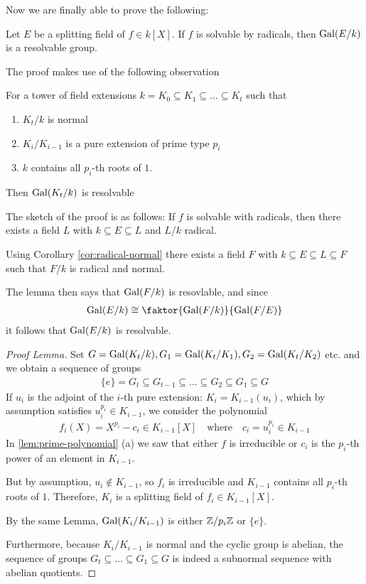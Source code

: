 
Now we are finally able to prove the following:
\begin{thm}[]\label{thm:3-14}
  Let $E$ be a splitting field of $f \in k[X]$.
  If $f$ is solvable by radicals, then $\operatorname{Gal}(E/k)$ is a resolvable group.
\end{thm}
The proof makes use of the following observation
\begin{lem}[]
  For a tower of field extensions
  $
    k = K_0 \subseteq K_1 \subseteq \ldots \subseteq K_t
  $
  such that
  \begin{enumerate}
    \item $K_t/k$ is normal
    \item $K_i/K_{i-1}$ is a pure extension of prime type $p_i$
    \item $k$ contains all $p_i$-th roots of $1$.
  \end{enumerate}
  Then $\operatorname{Gal}(K_t/k)$ is resolvable
\end{lem}
The sketch of the proof is as follows: If $f$ is solvable with radicals, then there exists a field $L$ with $k \subseteq E \subseteq L$ and $L/k$ radical.

Using Corollary \ref{cor:radical-normal} there exists a field $F$ with $k \subseteq E \subseteq L \subseteq F$ such that $F/k$ is radical and normal.

The lemma then says that $\operatorname{Gal}(F/k)$ is resovlable, and since
\begin{align*}
  \Gal(E/k) \iso \faktor{\Gal(F/k)}{\Gal(F/E)}
\end{align*}
it follows that $\operatorname{Gal}(E/k)$ is resolvable.

\begin{proof}[Proof Lemma]
  Set $G = \operatorname{Gal}(K_t/k), G_1 = \operatorname{Gal}(K_t/K_1), G_2 = \operatorname{Gal}(K_t/K_2)$ etc. and we obtain a sequence of groups
  \begin{align*}
    \{e\} = G_t \subseteq G_{t-1} \subseteq \ldots \subseteq G_2 \subseteq G_1 \subseteq G
  \end{align*}
  If $u_i$ is the adjoint of the $i$-th pure extension: $K_i = K_{i-1}(u_i)$, which by assumption satisfies $u_i^{p_i} \in K_{i-1}$, we consider the polynomial
  \begin{align*}
    f_i(X) = X^{p_i} - c_i \in K_{i-1}[X] \quad \text{where} \quad c_i = u_i^{p_i} \in K_{i-1}
  \end{align*}
  In \ref{lem:prime-polynomial} (a) we saw that either $f$ is irreducible or $c_i$ is the $p_i$-th power of an element in $K_{i-1}$.

  But by assumption, $u_i \notin K_{i-1}$, so $f_i$ is irreducible and $K_{i-1}$ contains all $p_i$-th roots of $1$. Therefore, $K_i$ is a splitting field of $f_i \in K_{i-1}[X]$. 

  By the same Lemma, $\operatorname{Gal}(K_i/K_{i-1})$ is either $\mathbb{Z}/p_i\mathbb{Z}$ or $\{e\}$.

  Furthermore, because $K_i/K_{i-1}$ is normal and the cyclic group is abelian,
the sequence of groups $G_t \subseteq \ldots \subseteq G_1 \subseteq G$ is indeed a subnormal sequence with abelian quotients.
\end{proof}

